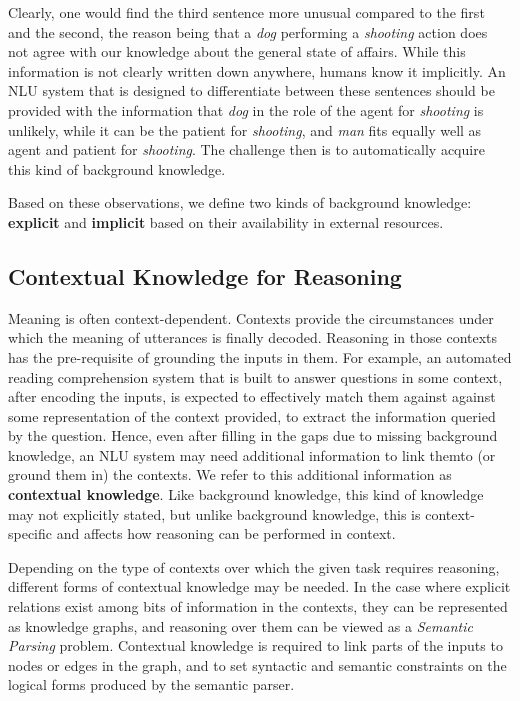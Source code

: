 Clearly, one would find the third sentence more unusual compared to the first and the second, the reason being that
a \emph{dog} performing a \emph{shooting} action does not agree with our knowledge about the general state
of affairs. While this information is not clearly written down anywhere, humans know it implicitly. An NLU
system that is designed to differentiate between these sentences should be provided with the information
that \emph{dog} in the role of the agent for \emph{shooting} is unlikely, while it can be the patient for
\emph{shooting}, and \emph{man} fits equally well as agent and patient for \emph{shooting}. The challenge then is to automatically acquire this kind of background knowledge.

Based on these observations, we define two kinds of background knowledge: \textbf{explicit} and \textbf{implicit} based on their availability in external resources.


\subsection{Contextual Knowledge for Reasoning}
Meaning is often context-dependent. Contexts provide the circumstances under which the meaning of utterances is finally decoded. Reasoning in those contexts has the pre-requisite of grounding the inputs
in them.
For example, an automated reading comprehension system that is built to answer questions in some context, after encoding the inputs, is expected to
effectively match them against against some representation of the context provided, to extract the information queried by the question.
Hence, even after filling in the gaps due to missing background knowledge, an NLU system may need additional information to link themto (or ground them in) the contexts.
We refer to this additional information as \textbf{contextual knowledge}.
Like background knowledge, this kind of knowledge may not explicitly stated, but unlike background knowledge, this is context-specific and affects how reasoning can be performed in context.

Depending on the type of contexts over which the given task requires reasoning, different forms of contextual knowledge may be needed. 
In the case where explicit relations exist among bits of information in the contexts, they can be represented as knowledge graphs, and reasoning
over them can be viewed as a \emph{Semantic Parsing} problem. Contextual knowledge is required to link parts of the inputs to nodes or edges in the graph, and to set syntactic and
semantic constraints on the logical forms produced by the semantic parser.

